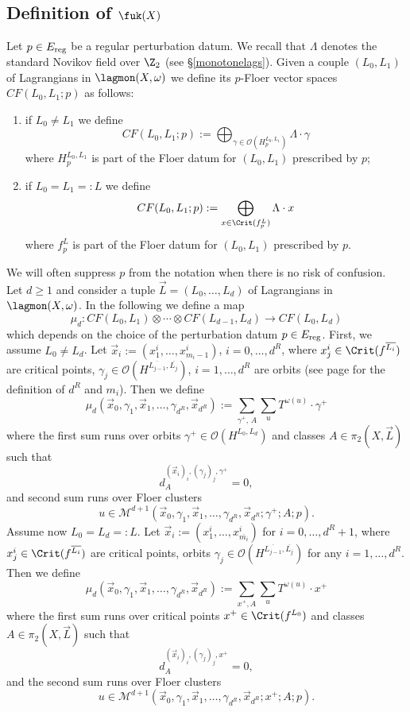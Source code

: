 	
	\subsection{Definition of $\fuk(X)$} Let $p\in E_\textnormal{reg}$ be a regular perturbation datum. We recall that $\Lambda$ denotes the standard Novikov field over $\Z_2$ (see \S \ref{monotonelags}). Given a couple $(L_0,L_1)$ of Lagrangians in $\lagmon(X,\omega)$ we define its $p$-Floer vector spaces $CF(L_0,L_1;p)$ as follows:
	\begin{enumerate}
		\item if $L_0\neq L_1$ we define $$CF(L_0,L_1;p):=\bigoplus_{\gamma\in \mathcal{O}(H^{L_0,L_1}_p)}\Lambda\cdot \gamma$$ where $H^{L_0,L_1}_p$ is part of the Floer datum for $(L_0,L_1)$ prescribed by $p$;
		\item if $L_0= L_1=:L$ we define $$CF(L_0,L_1;p):=\bigoplus_{x\in \Crit(f^{L}_p)}\Lambda\cdot x$$ where $f^L_p$ is part of the Floer datum for $(L_0,L_1)$ prescribed by $p$.
	\end{enumerate}
	We will often suppress $p$ from the notation when there is no risk of confusion.\\
	Let $d\geq 1$ and consider a tuple $\vec{L}=(L_0,\ldots,L_d)$ of Lagrangians in $\lagmon(X,\omega)$. In the following we define a map $$\mu_d: CF(L_0,L_1)\otimes \cdots \otimes CF(L_{d-1},L_d)\to CF(L_0,L_d)$$ which depends on the choice of the perturbation datum $p\in E_\textnormal{reg}$. First, we assume $L_0\neq L_d$. Let $\vec{x}_i:=(x^i_1,\ldots,x^i_{m_i-1})$, $i=0,\ldots,d^R$, where $x^i_j\in \Crit(f^{\overline{L_i}})$ are critical points, $\gamma_j\in \mathcal{O}(H^{\overline{L_{j-1}},\overline{L_j}})$, $i=1,\ldots,d^R$ are orbits (see page \pageref{defofmis} for the definition of $d^R$ and $m_i$). Then we define $$\mu_d(\vec{x}_0, \gamma_1, \vec{x}_1,\ldots,\gamma_{d^R}, \vec{x}_{d^R}):=\sum_{\gamma^+,\, A}\sum_u T^{\omega(u)}\cdot \gamma^+$$ where the first sum runs over orbits $\gamma^+\in \mathcal{O}(H^{L_0,L_d})$ and classes $A\in \pi_2(X,\vec{L})$ such that $$ d_{A}^{(\vec{x}_i)_i, (\gamma_j)_j,\gamma^+}=0,$$ and second sum runs over Floer clusters $$u\in \mathcal{M}^{d+1}\left(\vec{x}_0, \gamma_1, \vec{x}_1,\ldots,\gamma_{d^R}, \vec{x}_{d^R}; \gamma^+;A;p\right).$$
	Assume now $L_0=L_d=:L$. Let  $\vec{x}_i:=(x_1^i,\ldots,x_{\overline{m_i}}^i)$ for $i=0,\ldots,d^R+1$, where $x^i_j\in \Crit(f^{\overline{L_i}})$ are critical points, orbits $\gamma_j\in \mathcal{O}(H^{\overline{L_{j-1}},\overline{L_j}})$ for any $i=1,\ldots,d^R$. Then we define $$\mu_d(\vec{x}_0, \gamma_1, \vec{x}_1,\ldots,\gamma_{d^R}, \vec{x}_{d^R}):=\sum_{x^+, A}\sum_u T^{\omega(u)}\cdot x^+$$ where the first sum runs over critical points $x^+\in \Crit(f^{L_0})$ and classes $A\in \pi_2(X,\vec{L})$ such that $$d_{A}^{(\vec{x}_i)_i, (\gamma_j)_j,x^+}=0,$$ and the second sum runs over Floer clusters $$u\in \mathcal{M}^{d+1}\left(\vec{x}_0, \gamma_1, \vec{x}_1,\ldots,\gamma_{d^R}, \vec{x}_{d^R}; x^+;A;p\right).$$
	
